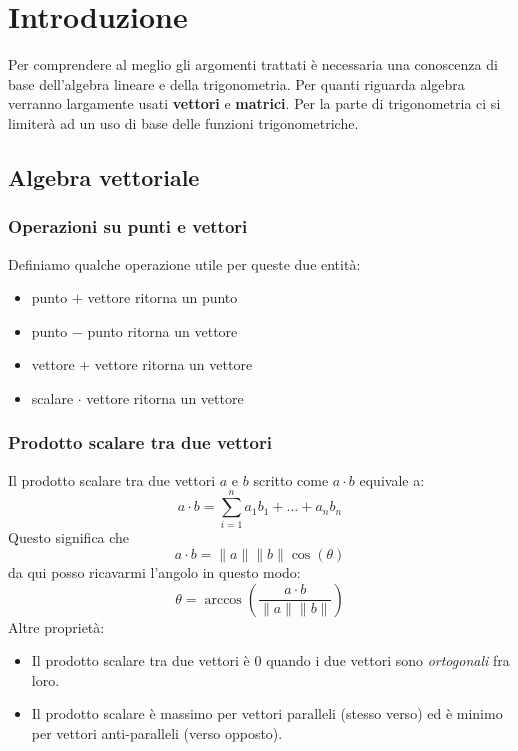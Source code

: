 \chapter{Introduzione}
Per comprendere al meglio gli argomenti trattati \`e necessaria una conoscenza di base
dell'algebra lineare e della trigonometria. Per quanti riguarda algebra verranno largamente usati
\textbf{vettori} e \textbf{matrici}. Per la parte di trigonometria ci si limiter\`a ad un uso di base
delle funzioni trigonometriche.

\section{Algebra vettoriale}
\subsection{Operazioni su punti e vettori}
Definiamo qualche operazione utile per queste due entit\`a:
\begin{itemize}
	\item punto $+$ vettore ritorna un punto
	\item punto $-$ punto ritorna un vettore
	\item vettore $+$ vettore ritorna un vettore
	\item scalare $\cdot$ vettore ritorna un vettore
\end{itemize}

\subsection{Prodotto scalare tra due vettori}
Il prodotto scalare tra due vettori $a$ e $b$ scritto come $a \cdot b$ equivale a:
\[ a \cdot b = \sum_{i=1}^n a_1 b_1 + \dots + a_n b_n  \]
Questo significa che
\[ a \cdot b = \| a \| \| b \| \cos{(\theta)} \]
da qui posso ricavarmi l'angolo in questo modo:
\[ \theta = \arccos{\left( \frac{a \cdot b}{\| a \| \| b \|} \right)} \]
Altre propriet\`a:
\begin{itemize}
	\item Il prodotto scalare tra due vettori \`e 0 quando i due vettori sono \emph{ortogonali}
	      fra loro.
	\item Il prodotto scalare \`e massimo per vettori paralleli (stesso verso) ed \`e minimo
	      per vettori anti-paralleli (verso opposto).
\end{itemize}

